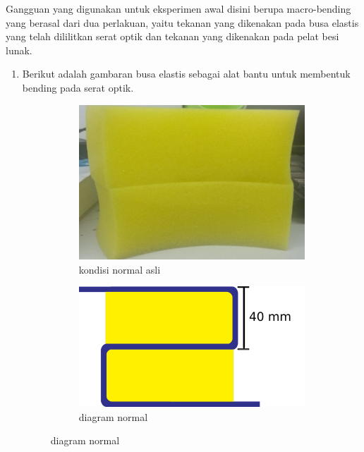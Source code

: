\documentclass[12pt]{article}
\begin{document}
	Gangguan yang digunakan untuk eksperimen awal disini berupa macro-bending yang berasal dari dua perlakuan, yaitu tekanan yang dikenakan pada busa elastis yang telah dililitkan serat optik dan tekanan yang dikenakan pada pelat besi lunak.
	
	
	\begin{enumerate}
		\item Berikut adalah gambaran busa elastis sebagai alat bantu untuk membentuk bending pada serat optik.
	
			\begin{figure}[h!]
				\centering
				\captionsetup{justification=centering}
				\begin{subfigure}[b]{0.3\textwidth}
					\includegraphics[width=\textwidth]{images/Bab_4/Bab_4_1a}	
					\caption{{\small kondisi normal asli}}		
				\end{subfigure}
				\begin{subfigure}[b]{0.3\textwidth}
					\includegraphics[width=\linewidth]{images/Bab_4/Bab_4_1b}
					\caption{{\small diagram normal}}			

\end{subfigure}
\end{figure}
\end{enumerate}
\end{document}
